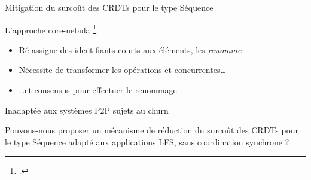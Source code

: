 \begin{frame}{Mitigation du surcoût des CRDTs pour le type Séquence}
    \begin{block}{L'approche core-nebula \footcite{zawirski:hal-01248197}}
        \begin{itemize}
            \item Ré-assigne des identifiants courts aux éléments, \ie les \emph{renomme}
            \item Nécessite de transformer les opérations \ins et \rmv concurrentes\dots
            \item \dots et consensus pour effectuer le renommage
        \end{itemize}
    \end{block}
    \alert{Inadaptée aux systèmes P2P sujets au churn}
\end{frame}

\begin{frame}[standout]
    Pouvons-nous proposer un mécanisme de réduction du surcoût des CRDTs pour le type Séquence adapté aux applications LFS, \ie  sans coordination synchrone ?
\end{frame}




